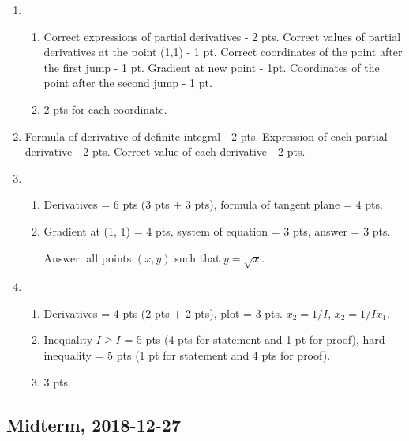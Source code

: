 \begin{enumerate}
 \item
   \begin{enumerate}
     \item  Correct expressions of partial derivatives - 2 pts.
      Correct values of partial derivatives at the point (1,1) - 1 pt.
      Correct coordinates of the point after the first jump - 1 pt. Gradient at new point
      - 1pt. Coordinates of the point after the second jump - 1 pt.
     \item 2 pts for each coordinate.
   \end{enumerate}

 \item
 Formula of derivative of definite integral - 2 pts.
 Expression of each partial derivative - 2 pts.
 Correct value of each derivative - 2 pts.

 \item
 \begin{enumerate}
   \item Derivatives = 6 pts (3 pts + 3 pts), formula of tangent plane = 4 pts.
   \item Gradient at (1, 1) = 4 pts, system of equation = 3 pts, answer = 3 pts.

   Answer: all points $(x, y)$ such that $y=\sqrt{x}$.
 \end{enumerate}
  \item


  \begin{enumerate}
    \item Derivatives = 4 pts (2 pts + 2 pts), plot = 3 pts. $x_2=1/I$, $x_2=1/Ix_1$.
    \item Inequality $I \geq I$ = 5 pts (4 pts for statement and 1 pt for proof),
    hard inequality = 5 pts (1 pt for statement and 4 pts for proof).
    \item 3 pts.
  \end{enumerate}

\end{enumerate}



\subsection{Midterm, 2018-12-27}

